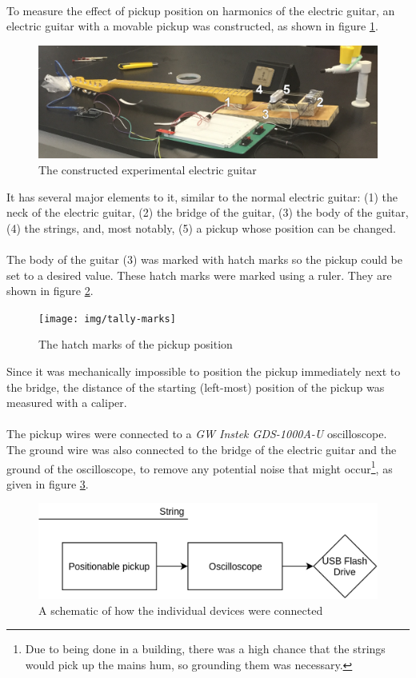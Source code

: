 \documentclass{article}
\begin{document}
\paragraph*{}
To measure the effect of pickup position on harmonics of the electric guitar, 
an electric guitar with a movable pickup was constructed, as shown in figure
\ref{fig:custom-guitar}.
\begin{figure}[ht]
	\centering
	\includegraphics[width=.8\textwidth]{img/constructed-guitar}
	\caption{The constructed experimental electric guitar}
	\label{fig:custom-guitar}
\end{figure}
It has several major elements to it, similar to the normal electric guitar: 
(1) the neck of the electric guitar, (2) the bridge of the guitar, (3) the 
body of the guitar, (4) the strings, and, most notably, (5) a pickup whose 
position can be changed.

\paragraph*{}
The body of the guitar (3) was marked with hatch marks so the pickup could be 
set to a desired value. These hatch marks were marked using a ruler. They are 
shown in figure \ref{fig:hatch-marks}.
\begin{figure}[ht]
	\centering
	\texttt{[image: img/tally-marks]}
	\caption{The hatch marks of the pickup position}
	\label{fig:hatch-marks}
\end{figure}
Since it was mechanically impossible to position the pickup immediately next 
to the bridge, the distance of the starting (left-most) position of the pickup 
was measured with a caliper.

\paragraph*{}
The pickup wires were connected to a \textit{GW Instek GDS-1000A-U} 
oscilloscope. The ground wire was also connected to the bridge of the electric 
guitar and the ground of the oscilloscope, to remove any potential noise that 
might occur\footnote{Due to being done in a building, there was a high chance
	that the strings would pick up the mains hum, so grounding them was
necessary.}, as given in figure \ref{fig:connection-schematic}.
\begin{figure}[ht]
	\centering
	\includegraphics[width=.5\textwidth]{img/connection-schematic}
	\caption{A schematic of how the individual devices were connected}
	\label{fig:connection-schematic}
\end{figure}
\end{document}
